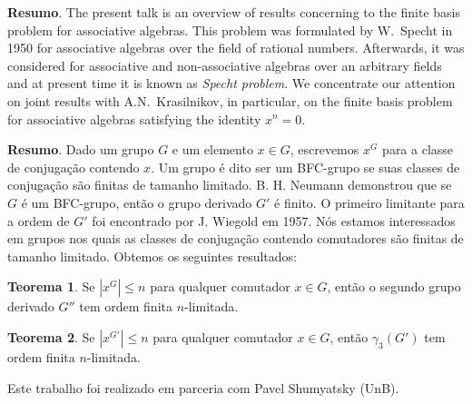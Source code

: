 \vspace{24pt}


	\noindent\textbf{Resumo}.\label{ea} 
	The present talk is an overview of results concerning to the finite basis problem for associative algebras. This problem was formulated by W.~Specht in 1950 for associative algebras over the field of rational numbers. Afterwards, it was considered for associative and non-associative algebras over an arbitrary fields and at present time it is known as \emph{Specht problem}. We concentrate our attention on joint results with A.N.~Krasilnikov,  in particular, on the finite basis problem for associative algebras satisfying the identity $x^{n}=0$.

	\vspace{24pt}
	
	
	\noindent\textbf{Resumo}.\label{gld} 
	Dado um grupo $G$ e um elemento $x\in G$, escrevemos $x^G$ para a classe de conjugação contendo $x$. Um grupo é dito ser um BFC-grupo se suas classes de conjugação são finitas de tamanho limitado. B. H. Neumann demonstrou que se $G$ é um BFC-grupo, então o grupo derivado $G'$ é finito. O primeiro limitante para a ordem de $G'$ foi encontrado por J. Wiegold em 1957. Nós estamos interessados em grupos nos quais as classes de conjugação contendo comutadores são finitas de tamanho limitado. Obtemos os seguintes resultados:
	
	{\bf Teorema 1}. Se $|x^G|\leq n$ para qualquer comutador $x\in G$, então o segundo grupo derivado $G''$ tem ordem finita $n$-limitada.
	
	{\bf Teorema 2}. Se $|x^{G'}|\leq n$ para qualquer comutador $x\in G$, então $\gamma_3(G')$ tem ordem finita $n$-limitada.
	
	\vspace*{0.5cm} \noindent Este trabalho foi realizado em parceria com Pavel Shumyatsky (UnB).
	
	\vspace{24pt}
	
